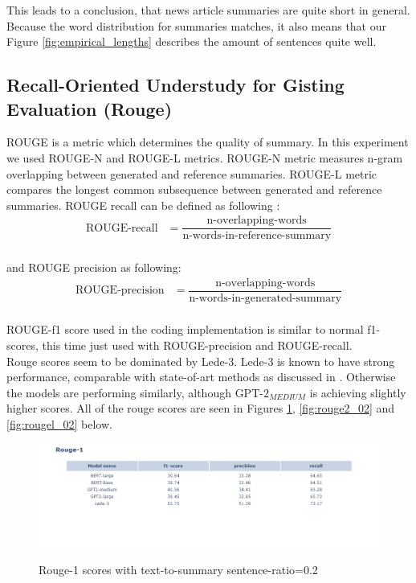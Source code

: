 \documentclass{article}
\newcommand{\gptmedium}{$\text{GPT-2}_{MEDIUM}$ }
\begin{document}
\noindent
This leads to a conclusion, that news article summaries are quite short in general. Because the word distribution for summaries matches, it also means that our Figure \ref{fig:empirical_lengths} describes the amount of sentences quite well.\\

\subsection{Recall-Oriented Understudy for Gisting Evaluation (Rouge)}

ROUGE is a metric which determines the quality of summary. In this experiment we used ROUGE-N and ROUGE-L metrics. ROUGE-N metric measures n-gram overlapping between generated and reference summaries. ROUGE-L metric compares the longest common subsequence between generated and reference summaries. ROUGE recall can be defined as following \cite{rouge}: \\

\begin{align*}
	\text{ROUGE-recall} &= \dfrac{\text{n-overlapping-words}}{\text{n-words-in-reference-summary}}
\end{align*}\\

\noindent
and ROUGE precision as following:\\

\begin{align*}
	\text{ROUGE-precision} &= \dfrac{\text{n-overlapping-words}}{\text{n-words-in-generated-summary}}
\end{align*}\\

\noindent
ROUGE-f1 score used in the coding implementation is similar to normal f1-scores, this time just used with ROUGE-precision and ROUGE-recall. \cite{rouge}\\

\noindent
Rouge scores seem to be dominated by Lede-3. Lede-3 is known to have strong performance, comparable with state-of-art methods as discussed in \cite{dataset}. Otherwise the models are performing similarly, although \gptmedium is achieving slightly higher scores. All of the rouge scores are seen in Figures \ref{fig:rouge1_02}, \ref{fig:rouge2_02} and \ref{fig:rougel_02} below. 

\begin{figure}[H]
	\centering
	\hspace*{-3cm}
	\includegraphics[scale=0.55]{rouge1.png}\\
	\caption{Rouge-1 scores with text-to-summary sentence-ratio=0.2}
	\label{fig:rouge1_02}
\end{figure}
\end{document}
